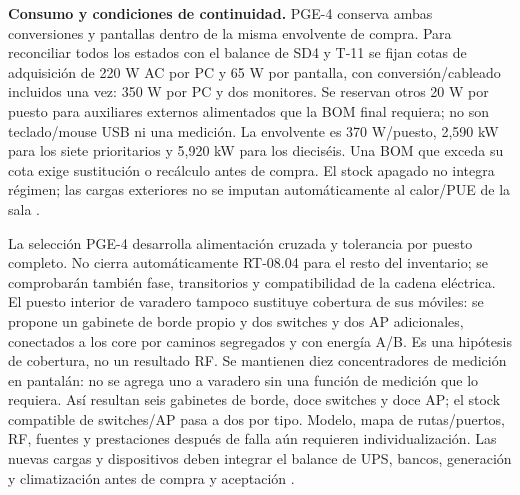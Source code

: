 \textbf{Consumo y condiciones de continuidad.} PGE-4 conserva ambas conversiones y pantallas dentro de la misma envolvente de compra. Para reconciliar todos los estados con el balance de SD4 y T-11 se fijan cotas de adquisición de 220 W AC por PC y 65 W por pantalla, con conversión/cableado incluidos una vez: 350 W por PC y dos monitores. Se reservan otros 20 W por puesto para auxiliares externos alimentados que la BOM final requiera; no son teclado/mouse USB ni una medición. La envolvente es 370 W/puesto, 2,590 kW para los siete prioritarios y 5,920 kW para los dieciséis. Una BOM que exceda su cota exige sustitución o recálculo antes de compra. El stock apagado no integra régimen; las cargas exteriores no se imputan automáticamente al calor/PUE de la sala \parencites{p6-puestos-quint,p6-puestos-eizo}.

La selección PGE-4 desarrolla alimentación cruzada y tolerancia por puesto completo. No cierra automáticamente RT-08.04 para el resto del inventario; se comprobarán también fase, transitorios y compatibilidad de la cadena eléctrica. El puesto interior de varadero tampoco sustituye cobertura de sus móviles: se propone un gabinete de borde propio y dos switches y dos AP adicionales, conectados a los core por caminos segregados y con energía A/B. Es una hipótesis de cobertura, no un resultado RF. Se mantienen diez concentradores de medición en pantalán: no se agrega uno a varadero sin una función de medición que lo requiera. Así resultan seis gabinetes de borde, doce switches y doce AP; el stock compatible de switches/AP pasa a dos por tipo. Modelo, mapa de rutas/puertos, RF, fuentes y prestaciones después de falla aún requieren individualización. Las nuevas cargas y dispositivos deben integrar el balance de UPS, bancos, generación y climatización antes de compra y aceptación \parencites[RT-08.04, p.~18]{pucv-transversal}[cap.~15, RT-03.24 y RT-06.01]{caso07}.

